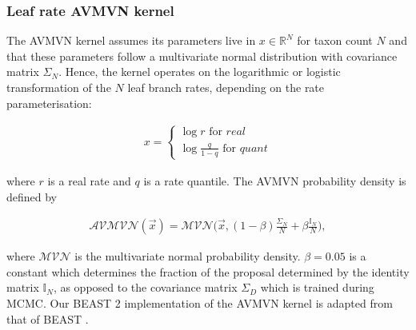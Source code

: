 \documentclass[10pt,letterpaper]{article}
\begin{document}
\subsubsection*{Leaf rate AVMVN kernel}


The AVMVN kernel assumes its parameters live in $x \in \mathbb{R}^N$ for taxon count $N$ and that these parameters follow a multivariate normal distribution with covariance matrix $\Sigma_N$. Hence, the kernel operates on the logarithmic or logistic transformation of the $N$ leaf branch rates, depending on the rate parameterisation:

\begin{align}
	x = \begin{cases} \log r \text{ for } \textit{real} \\
						\log \frac{q}{1 - q} \text{ for } \textit{quant}  \end{cases}
\end{align}

\noindent
where $r$ is a real rate and $q$ is a rate quantile. The AVMVN probability density is defined by 


\begin{align}
	\mathcal{AVMVN}(\vec{x}) =  \mathcal{MVN}\big(\vec{x}, (1-\beta) \frac{\Sigma_N}{N} + \beta \frac{\mathbb{I}_N}{N} \big) ,
\end{align}


\noindent
where $\mathcal{MVN}$ is the multivariate normal probability density. $\beta  = 0.05$ is a constant which determines the fraction of the proposal determined by the identity matrix $\mathbb{I}_N$, as opposed to the covariance matrix $\Sigma_D$ which is trained during MCMC.
Our BEAST 2 implementation of the AVMVN kernel is adapted from that of BEAST \cite{suchard2018bayesian}.





\end{document}
